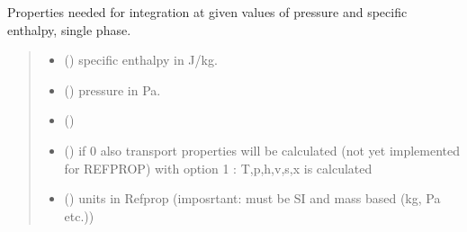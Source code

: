 \documentclass[letterpaper,10pt,english]{sphinxmanual}
\begin{document}

\begin{fulllineitems}
\label{\detokenize{fluid_properties_rp:fluid_properties_rp.hp}}
\pysigstartsignatures
{}
\pysigstopsignatures
\sphinxAtStartPar
Properties needed for integration at given  values of pressure
and specific enthalpy, single phase.
\begin{quote}\begin{description}
\begin{itemize}
\item {} 
\sphinxAtStartPar
{} () \textendash{} specific enthalpy in J/kg.

\item {} 
\sphinxAtStartPar
{} () \textendash{} pressure in Pa.

\item {} 
\sphinxAtStartPar
{} () \textendash{} 

\item {} 
\sphinxAtStartPar
{} () \textendash{} if 0 also transport properties will be calculated
(not yet implemented for REFPROP)
with option 1 : T,p,h,v,s,x is calculated

\item {} 
\sphinxAtStartPar
{} () \textendash{} units in Refprop (imposrtant: must be SI and mass based (kg, Pa etc.))


\end{itemize}
\end{description}
\end{quote}
\end{fulllineitems}
\end{document}

